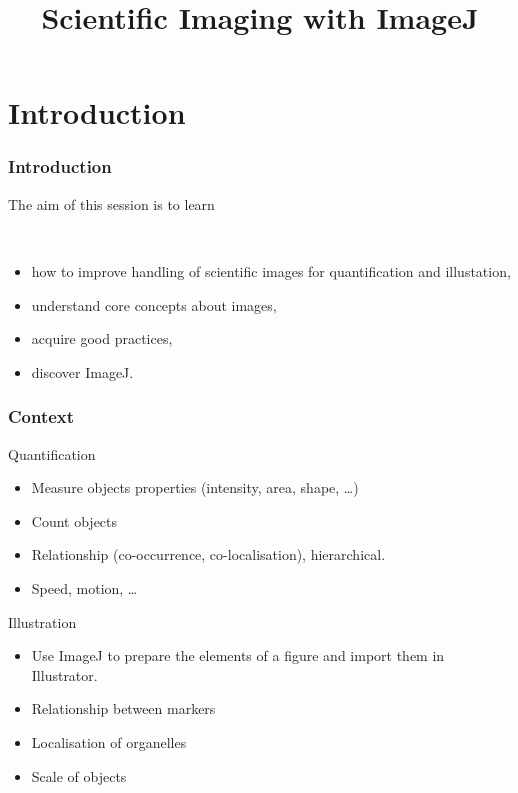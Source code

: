 \documentclass[ignorenonframetext,aspectratio=169,10pt,xcolor=table]{beamer}
\title{Scientific Imaging with ImageJ}
\begin{document}
\begin{frame}
  \maketitle
\end{frame}

\section{Introduction}

\begin{frame} \frametitle<presentation>{Introduction}
  The aim of this session is to learn

  ~~

  \begin{itemize}   \setlength\itemsep{1em}
    \item how to improve handling of scientific images for quantification and
      illustation,
    \item understand core concepts about images,
    \item acquire good practices,
    \item discover ImageJ.
  \end{itemize}
\end{frame}


\begin{frame} \frametitle{Context}
  \begin{block}{Quantification}
    \begin{itemize}
    \item Measure objects properties (intensity, area, shape, \dots)
    \item Count objects
    \item Relationship (co-occurrence, co-localisation), hierarchical.
    \item Speed, motion, \dots
    \end{itemize}
  \end{block}
  \begin{block}{Illustration}

    \begin{itemize}
    \item Use ImageJ to prepare the elements of a figure and import
      them in Illustrator.
    \item Relationship between markers
    \item Localisation of organelles
    \item Scale of objects
    \end{itemize}
  \end{block}
\end{frame}
\end{document}
